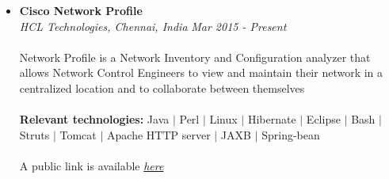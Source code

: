 \documentclass[a4paper, 12pt]{article}
\begin{document}
\begin{adjustwidth}{1.3em}{0pt}
\begin{itemize}
  \item \textbf{Cisco Network Profile}\\
        \textsl{HCL Technologies, Chennai, India} \hfill
        \emph{Mar 2015 - Present}\\
        \\
        Network Profile is a Network Inventory and Configuration analyzer that
        allows Network Control Engineers to view and maintain their network in a
        centralized location and to collaborate between themselves\\
        \\
        \textbf{\small{Relevant technologies:}} Java $|$ Perl $|$ Linux $|$
        Hibernate $|$ Eclipse $|$ Bash $|$ Struts $|$ Tomcat $|$ Apache HTTP
        server $|$ JAXB $|$ Spring-bean\\
        \\
        A public link is available \href{http://www.cisco.com/web/tsweb/tools/network-profile/index.html}{\emph{here}}
\end{itemize}
\end{adjustwidth}
\end{document}
